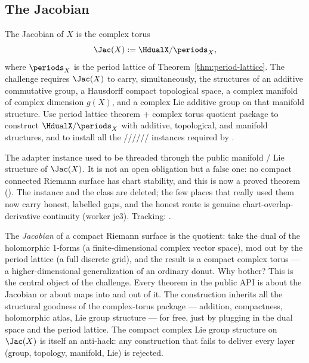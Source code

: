 \subsection{The Jacobian}

\begin{definition}
\label{def:analytic-jacobian}
The Jacobian of \(X\) is the complex torus
\[
  \Jac(X) := \HdualX / \periods_X ,
\]
where \(\periods_X\) is the period lattice of Theorem~\ref{thm:period-lattice}.
The challenge requires \(\Jac(X)\) to carry, simultaneously, the
structures of an additive commutative group, a Hausdorff compact
topological space, a complex manifold of complex dimension \(g(X)\), and
a complex Lie additive group on that manifold structure.
\leanok
\proofplan
Use period lattice theorem + complex torus quotient package to construct
\(\HdualX/\periods_X\) with additive, topological, and manifold structures, and
to install all the //////
instances required by .
\end{definition}

\begin{lemma}
\label{lem:stable-chart-at-instance}
The  adapter instance used to be threaded through the public manifold /
Lie structure of \(\Jac(X)\). It is not an open obligation but a false one: no
compact connected Riemann surface has chart stability, and this is now a proved
theorem (). The instance and the class are
deleted; the few places that really used them now carry honest, labelled gaps,
and the honest route is genuine chart-overlap-derivative continuity (worker jc3).
Tracking: .
\leanok
\end{lemma}

\begin{layman}
The \emph{Jacobian} of a compact Riemann surface is the quotient: take
the dual of the holomorphic 1-forms (a finite-dimensional complex
vector space), mod out by the period lattice (a full discrete grid),
and the result is a compact complex torus --- a higher-dimensional
generalization of an ordinary donut. Why bother? This is the central
object of the challenge. Every theorem in the public API is about the
Jacobian or about maps into and out of it. The construction inherits
all the structural goodness of the complex-torus package --- addition,
compactness, holomorphic atlas, Lie group structure --- for free, just
by plugging in the dual space and the period lattice. The compact
complex Lie group structure on \(\Jac(X)\) is itself an anti-hack: any
construction that fails to deliver every layer (group, topology,
manifold, Lie) is rejected.
\end{layman}

